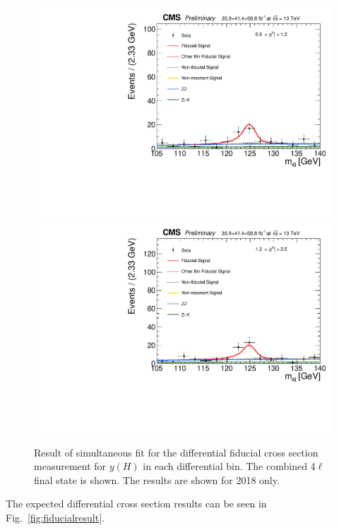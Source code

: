 \begin{figure}[!h]
	\includegraphics[width=0.32\linewidth]{Figures/results/fiducial/comb/unblind_Feb25/data_unfoldwith_SM_125_v3_rapidity4l_4l_recobin4.pdf}
	\includegraphics[width=0.32\linewidth]{Figures/results/fiducial/comb/unblind_Feb25/data_unfoldwith_SM_125_v3_rapidity4l_4l_recobin5.pdf}
	\caption{Result of simultaneous fit for the differential fiducial cross section measurement for $y(H)$
		in each differential bin. The combined 4$\ell$ final state is shown. The results are shown for 2018 only. \label{fig:differentialfitNjets}}
\end{figure}


The expected differential cross section results can be seen in Fig.~\ref{fig:fiducialresult}. 


